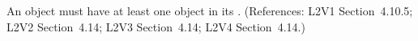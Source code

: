 An \Event object must have at least one \EventAssignment object in its
.  (References: L2V1 Section~4.10.5; L2V2
Section~4.14; L2V3 Section~4.14; L2V4 Section~4.14.)
